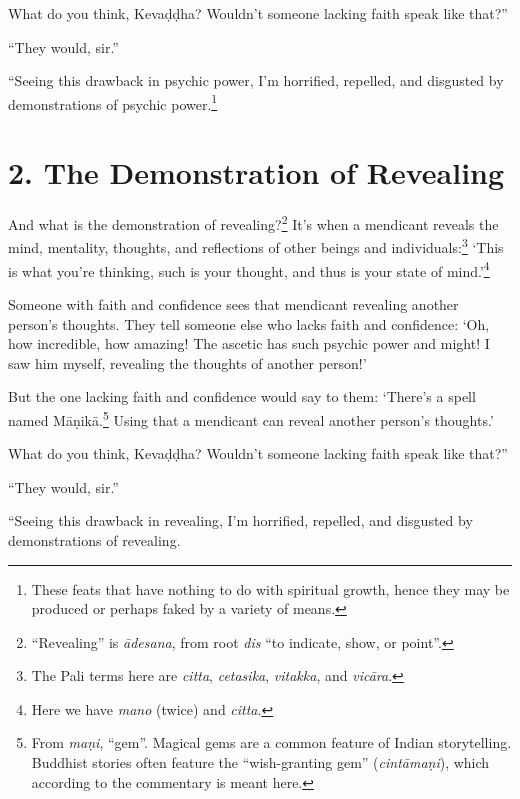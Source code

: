 \documentclass[12pt,openany]{book}%
\begin{document}
What do you think, \textsanskrit{Kevaḍḍha}? Wouldn’t someone lacking faith speak like that?” 

“They would, sir.” 

“Seeing this drawback in psychic power, I’m horrified, repelled, and disgusted by demonstrations of psychic power.\footnote{These feats that have nothing to do with spiritual growth, hence they may be produced or perhaps faked by a variety of means. } 

\section*{2. The Demonstration of Revealing }

And what is the demonstration of revealing?\footnote{“Revealing” is \textit{\textsanskrit{ādesana}}, from root \textit{dis} “to indicate, show, or point”. } It’s when a mendicant reveals the mind, mentality, thoughts, and reflections of other beings and individuals:\footnote{The Pali terms here are \textit{citta}, \textit{cetasika}, \textit{vitakka}, and \textit{\textsanskrit{vicāra}}. } ‘This is what you’re thinking, such is your thought, and thus is your state of mind.’\footnote{Here we have \textit{mano} (twice) and \textit{citta}. } 

Someone with faith and confidence sees that mendicant revealing another person’s thoughts. They tell someone else who lacks faith and confidence: ‘Oh, how incredible, how amazing! The ascetic has such psychic power and might! I saw him myself, revealing the thoughts of another person!’ 

But the one lacking faith and confidence would say to them: ‘There’s a spell named \textsanskrit{Māṇikā}.\footnote{From \textit{\textsanskrit{maṇi}}, “gem”. Magical gems are a common feature of Indian storytelling. Buddhist stories often feature the “wish-granting gem” (\textit{\textsanskrit{cintāmaṇi}}), which according to the commentary is meant here. } Using that a mendicant can reveal another person’s thoughts.’ 

What do you think, \textsanskrit{Kevaḍḍha}? Wouldn’t someone lacking faith speak like that?” 

“They would, sir.” 

“Seeing this drawback in revealing, I’m horrified, repelled, and disgusted by demonstrations of revealing. 
\end{document}
